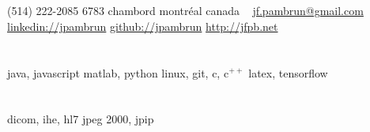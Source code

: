 \documentclass[print]{friggeri-cv}
\begin{document}

\newcommand{\eletr}{\href{http://www.etsmtl.ca/Programmes-Etudes/1er-cycle/Fiche-de-cours?Sigle=ELE747}{ele{\footnotesize747}}}
\newcommand{\eleenv}{\href{http://www.etsmtl.ca/Programmes-Etudes/1er-cycle/Fiche-de-cours?Sigle=ELE116}{ele{\footnotesize116}}}
\newcommand{\infmat}{\href{http://www.polymtl.ca/etudes/cours/details.php?sigle=INF1005a}{inf{\footnotesize1005}a}}
\newcommand{\gtssys}{\href{http://www.etsmtl.ca/Futurs-etudiants/Cycles-sup/Fiche-de-cours?Sigle=GTS840}{gts{\footnotesize840}}}

\begin{aside}
  \section{}
  {\small(514) 222-2085}
  {\small6783} chambord
  montréal
  canada
  ~
  \href{mailto:jf.pambrun@gmail.com}{jf.pambrun@gmail.com}
  \href{https://ca.linkedin.com/in/jpambrun}{linkedin://jpambrun}
  \href{http://github.com/jpambrun}{github://jpambrun}
  \href{http://jfpb.net}{http://jfpb.net}
  \section{}
  \section{}
  java, javascript
  matlab, python
  linux, git, c, c{\tiny$^{++}$}
  latex, tensorflow
  \section{}
  dicom, ihe, hl{\small7}
  jpeg {\small2000}, jpip

\end{aside}
\end{document}
